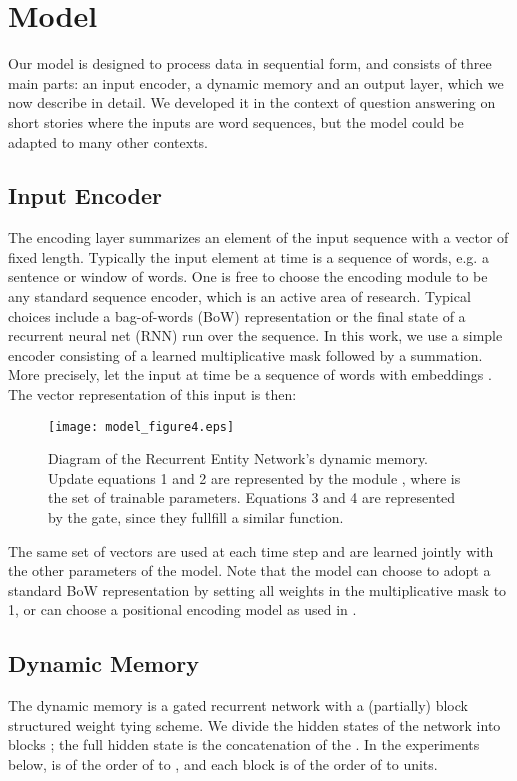 \documentclass{article} \usepackage{iclr2016_conference,times}
\newcommand{\modelname}{Recurrent Entity Network}
\begin{document}
\section{Model}

Our model is designed to process data in sequential form, and consists of three main parts: an input encoder, a dynamic memory and an output layer, which we now describe in detail.
We developed it in the context of question answering on short stories where the inputs are word sequences, but the model could be adapted to many other contexts.



\subsection{Input Encoder} The encoding layer summarizes an element of the input sequence with a vector of fixed length. 
Typically the input element at time 
 is a sequence of words, e.g. a sentence or window of words. 
One is free to choose the encoding module to be any standard sequence encoder, which is an active
area of research. Typical choices include
a bag-of-words (BoW) representation or the final state of a recurrent neural net (RNN)
 run over the sequence.
In this work, we use a simple encoder consisting of a learned multiplicative mask followed
by a summation. 
More precisely, let the input at time  be a sequence of words with embeddings .
The vector representation of this input is then:





\begin{figure}[ht]
\begin{center}
\texttt{[image: model\_figure4.eps]}
\end{center}
\caption{Diagram of the \modelname's dynamic memory. Update equations 1 and 2 are represented by the module , where  is the set of trainable parameters. Equations 3 and 4 are represented by the gate, since they fullfill a similar function.}
\end{figure}

The same set of vectors  are used at each time step and are learned jointly with the other parameters of the model.
Note that the model can choose to adopt a standard BoW representation by setting all weights in the multiplicative mask to 1, or can choose a positional encoding model as used in \citep{MemN2N}.


\subsection{Dynamic Memory}
The dynamic memory is a gated recurrent network with a (partially) block structured weight tying scheme. 
We divide the hidden states of the network into blocks ; the full hidden state is the concatenation of the .  In the experiments below,  is of the order of  to , and each block  is of the order of  to  units.
\end{document}
